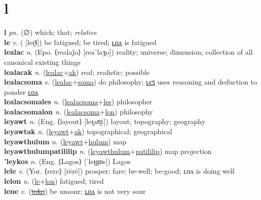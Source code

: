 \section{l}

\textbf{l} \textit{pn.} (∅)
which; that; \textit{relative} \label{l} \\
\textbf{le} \textit{v.} ( [leɪ̯˥˩])
be fatigued; be tired; \hyperref[lelon]{ʟᴏᴧ} is fatigued \label{le} \\
\textbf{lealac} \textit{n.} (Epo. ⟨realaĵo⟩ [reaˈlaʒo])
reality; universe; dimension; collection of all canonical existing things \label{lealac} \\
\textbf{lealacak} \textit{n.} (\hyperref[lealac]{lealac}+\hyperref[ak]{ak})
real; realistic; possible \label{lealacak} \\
\textbf{lealacsoma} \textit{v.} (\hyperref[lealac]{lealac}+\hyperref[soma]{soma})
do philosophy; \hyperref[lealacsomales]{ʟєꜱ} uses reasoning and deduction to ponder \hyperref[lealacsomalon]{ʟᴏᴧ} \label{lealacsoma} \\
\textbf{lealacsomales} \textit{n.} (\hyperref[lealacsoma]{lealacsoma}+\hyperref[les]{les})
philosopher \label{lealacsomales} \\
\textbf{lealacsomalon} \textit{n.} (\hyperref[lealacsoma]{lealacsoma}+\hyperref[lon]{lon})
philosophy \label{lealacsomalon} \\
\textbf{leyawt} \textit{n.} (Eng. ⟨layout⟩ [leɪ̯aʊ̯t])
layout; topography; geography \label{leyawt} \\
\textbf{leyawtak} \textit{n.} (\hyperref[leyawt]{leyawt}+\hyperref[ak]{ak})
topographical; geographical \label{leyawtak} \\
\textbf{leyawthulum} \textit{n.} (\hyperref[leyawt]{leyawt}+\hyperref[hulum]{hulum})
map \label{leyawthulum} \\
\textbf{leyawthulumpatililip} \textit{n.} (\hyperref[leyawthulum]{leyawthulum}+\hyperref[patililip]{patililip})
map projection \label{leyawthulumpatililip} \\
\textbf{'leykos} \textit{n.} (Eng. ⟨Lagos⟩ [ˈleɪ̯ɡɒs])
Lagos \label{'leykos} \\
\textbf{lele} \textit{v.} (Yor. ⟨rere⟩ [rērē])
prosper; fare; be-well; be-good; ʟᴏᴧ is doing well \label{lele} \\
\textbf{lelon} \textit{n.} (\hyperref[le]{le}+\hyperref[lon]{lon})
fatigued; tired \label{lelon} \\
\textbf{lene} \textit{v.} (\hyperref[toko]{\sout{toko}})
be unsour; \hyperref[lenelon]{ʟᴏᴧ} is not very sour \label{lene} \\
